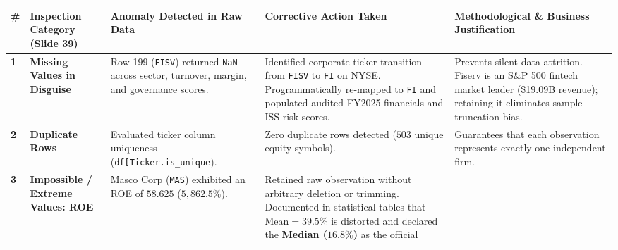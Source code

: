 \documentclass[
]{article}
\newcounter{none} %
\begin{document}
{\def\LTcaptype{none} %
\begin{longtable}[]{@{}
  >{\raggedright\arraybackslash}p{}
  >{\raggedright\arraybackslash}p{}
  >{\raggedright\arraybackslash}p{}
  >{\raggedright\arraybackslash}p{}
  >{\raggedright\arraybackslash}p{}@{}}
\toprule\noalign{}
\begin{minipage}[b]{\linewidth}\raggedright
\#
\end{minipage} & \begin{minipage}[b]{\linewidth}\raggedright
Inspection Category (Slide 39)
\end{minipage} & \begin{minipage}[b]{\linewidth}\raggedright
Anomaly Detected in Raw Data
\end{minipage} & \begin{minipage}[b]{\linewidth}\raggedright
Corrective Action Taken
\end{minipage} & \begin{minipage}[b]{\linewidth}\raggedright
Methodological \& Business Justification
\end{minipage} \\
\midrule\noalign{}
\endhead
\bottomrule\noalign{}
\endlastfoot
\textbf{1} & \textbf{Missing Values in Disguise} & Row 199
(\texttt{FISV}) returned \texttt{NaN} across sector, turnover, margin,
and governance scores. & Identified corporate ticker transition from
\texttt{FISV} to \texttt{FI} on NYSE. Programmatically re-mapped to
\texttt{FI} and populated audited FY2025 financials and ISS risk scores.
& Prevents silent data attrition. Fiserv is an S\&P 500 fintech market
leader (\$19.09B revenue); retaining it eliminates sample truncation
bias. \\
\textbf{2} & \textbf{Duplicate Rows} & Evaluated ticker column
uniqueness
(\texttt{df{[}\textquotesingle{}Ticker\textquotesingle{}{]}.is\_unique}).
& Zero duplicate rows detected (\(503\) unique equity symbols). &
Guarantees that each observation represents exactly one independent
firm. \\
\textbf{3} & \textbf{Impossible / Extreme Values: ROE} & Masco Corp
(\texttt{MAS}) exhibited an ROE of \(58.625\) (\(5,862.5\%\)). &
Retained raw observation without arbitrary deletion or trimming.
Documented in statistical tables that \(\text{Mean} = 39.5\%\) is
distorted and declared the \textbf{Median (\(16.8\%\))} as the official

\end{longtable}}
\end{document}
